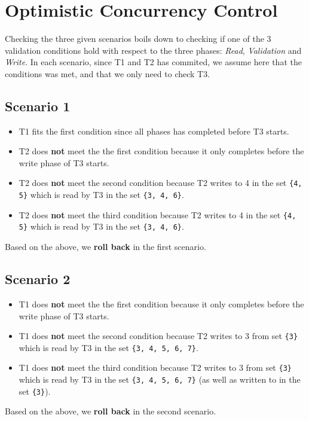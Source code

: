 
\section{Optimistic Concurrency Control}

Checking the three given scenarios boils down to checking if one of the 3 validation conditions hold with respect to the three phases: {\it Read}, {\it Validation} and {\it Write}. In each scenario, since T1 and T2 has commited, we assume here that the conditions was met, and that we only need to check T3.

\subsection{Scenario 1}

\begin{itemize}
\item T1 fits the first condition since all phases has completed before T3 starts.
\item T2 does {\bf not} meet the the first condition because it only completes before the write phase of T3 starts.
\item T2 does {\bf not} meet the second condition because T2 writes to 4 in the set \verb|{4, 5}| which is read by T3 in the set \verb|{3, 4, 6}|.
\item T2 does {\bf not} meet the third condition because T2 writes to 4 in the set \verb|{4, 5}| which is read by T3 in the set \verb|{3, 4, 6}|.
\end{itemize}
Based on the above, we {\bf roll back} in the first scenario.

\subsection{Scenario 2}

\begin{itemize}
\item T1 does {\bf not} meet the the first condition because it only completes before the write phase of T3 starts.
\item T1 does {\bf not} meet the second condition because T2 writes to 3 from set \verb|{3}| which is read by T3 in the set \verb|{3, 4, 5, 6, 7}|.
\item T1 does {\bf not} meet the third condition because T2 writes to 3 from set \verb|{3}| which is read by T3 in the set \verb|{3, 4, 5, 6, 7}| (as well as written to in the set \verb|{3}|).
\end{itemize}
Based on the above, we {\bf roll back} in the second scenario.

